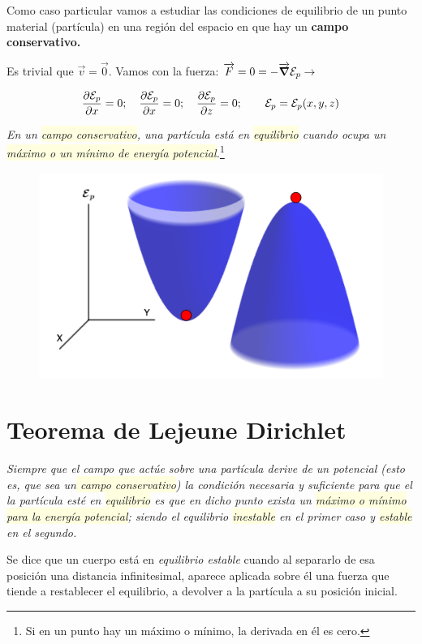 Como caso particular vamos a estudiar las condiciones de equilibrio de un punto material (partícula) en una región del espacio en que hay un \textbf{campo conservativo.}


Es trivial que $\vec v=\vec 0$. Vamos con la fuerza: $\overrightarrow{F}=0=-\overrightarrow{\grad}{\mathcal E_p} \to $

$$\displaystyle \pdv{\mathcal E_p}{x}=0;\quad \pdv{\mathcal E_p}{x}=0;\quad \pdv{\mathcal E_p}{z}=0;\qquad \mathcal E_p=\mathcal E_p(x,y,z)$$


\emph{En un \colorbox{LightYellow}{campo conservativo}, una partícula está en \colorbox{LightYellow}{equilibrio} cuando ocupa un \colorbox{LightYellow}{máximo o un mínimo de energía potencial}.}\footnote{Si en un punto hay un máximo o mínimo, la derivada en él es cero.}

\begin{figure}[H]
	\centering
	\includegraphics[width=.75\textwidth]{imagenes/imagenes05/T05IM02.png}
\end{figure}

\section{Teorema de Lejeune Dirichlet}
\label{Lejeune-Dirichlet}

\emph{Siempre que el campo que actúe sobre una partícula derive de un potencial (esto es, que sea un\colorbox{LightYellow}{ campo conservativo}) la condición necesaria y suficiente para que el la partícula esté en \colorbox{LightYellow}{equilibrio} es que en dicho punto exista un \colorbox{LightYellow}{máximo o mínimo para la energía potencial}; siendo el equilibrio \colorbox{LightYellow}{inestable} en el primer caso y \colorbox{LightYellow}{estable} en el segundo.}

Se dice que un cuerpo está en \emph{equilibrio estable} cuando al separarlo de esa posición una distancia infinitesimal, aparece aplicada sobre él una fuerza que tiende a restablecer el equilibrio, a devolver a la partícula a su posición inicial.

